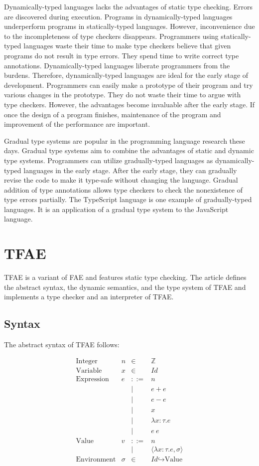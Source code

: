 Dynamically-typed languages lacks the advantages of static type checking. Errors
are discovered during execution. Programs in dynamically-typed languages
underperform programs in statically-typed languages. However, inconvenience due
to the incompleteness of type checkers disappears. Programmers using
statically-typed languages waste their time to make type checkers believe that
given programs do not result in type errors. They spend time to write correct
type annotations. Dynamically-typed languages liberate programmers from the
burdens. Therefore, dynamically-typed languages are ideal for the early stage of
development. Programmers can easily make a prototype of their program and try
various changes in the prototype. They do not waste their time to argue with type
checkers. However, the advantages become invaluable after the early stage. If
once the design of a program finishes, maintenance of the program and improvement
of the performance are important.

Gradual type systems are popular in the programming language research these days.
Gradual type systems aim to combine the advantages of static and dynamic type
systems. Programmers can utilize gradually-typed languages as dynamically-typed
languages in the early stage. After the early stage, they can gradually revise
the code to make it type-safe without changing the language. Gradual addition of
type annotations allows type checkers to check the nonexistence of type errors
partially. The TypeScript language is one example of gradually-typed languages.
It is an application of a gradual type system to the JavaScript language.

\section{TFAE}

TFAE is a variant of FAE and features static type checking. The article defines
the abstract syntax, the dynamic semantics, and the type system of TFAE and
implements a type checker and an interpreter of TFAE.

\subsection{Syntax}

The abstract syntax of TFAE follows:

\[
\begin{array}{lrcl}
\text{Integer} & n & \in & \mathbb{Z} \\
\text{Variable} & x & \in & \textit{Id} \\
\text{Expression} & e & ::= & n \\
&& | & e + e \\
&& | & e - e \\
&& | & x \\
&& | & \lambda x:\tau.e \\
&& | & e\ e \\
\text{Value} & v & ::= & n \\
&& | & \langle \lambda x:\tau.e,\sigma \rangle \\
\text{Environment} & \sigma & \in & \textit{Id}\hookrightarrow\text{Value}
\end{array}
\]

